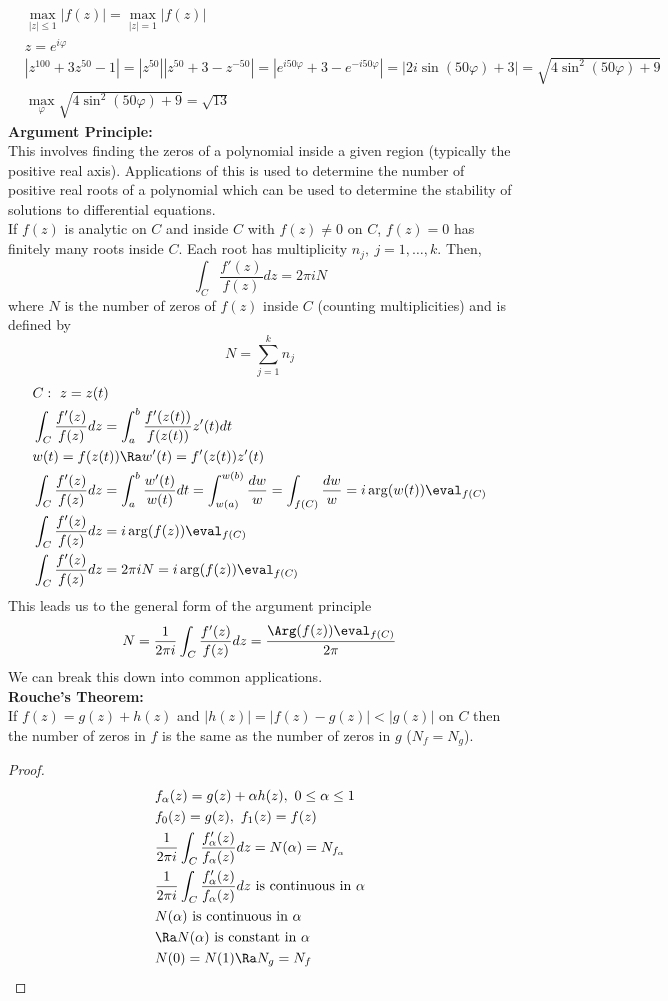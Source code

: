 \begin{align*}
    &\max_{|z|\leq1}|f(z)|=\max_{|z|=1}|f(z)|\\
    &z=e^{i\varphi}\\
    &|z^{100}+3z^{50}-1|=|z^{50}||z^{50}+3-z^{-50}|=|e^{i50\varphi}+3-e^{-i50\varphi}|=|2i\sin(50\varphi)+3|=\sqrt{4\sin^2(50\varphi)+9}\\
    &\max_{\varphi}\sqrt{4\sin^2(50\varphi)+9}=\sqrt{13}
\end{align*}
\textbf{Argument Principle:}\\
This involves finding the zeros of a polynomial inside a given region (typically the positive real axis). Applications of this is used to determine the number of positive real roots of a polynomial which can be used to determine the stability of solutions to differential equations.\\
If $f(z)$ is analytic on $C$ and inside $C$ with $f(z)\neq0$ on $C$, $f(z)=0$ has finitely many roots inside $C$. Each root has multiplicity $n_j,\ j=1,\ldots,k$. Then,
\[\int_C\frac{f'(z)}{f(z)}dz=2\pi iN\]
where $N$ is the number of zeros of $f(z)$ inside $C$ (counting multiplicities) and is defined by
\[N=\sum_{j=1}^k n_j\]
\begin{align*}
    &C:\ z=z(t)\\
    &\int_C\frac{f'(z)}{f(z)}dz=\int_a^b\frac{f'(z(t))}{f(z(t))}z'(t)dt\\
    &w(t)=f(z(t))\Ra w'(t)=f'(z(t))z'(t)\\
    &\int_C\frac{f'(z)}{f(z)}dz=\int_a^b\frac{w'(t)}{w(t)}dt=\int_{w(a)}^{w(b)}\frac{dw}{w}=\int_{f(C)}\frac{dw}{w}=i\arg(w(t))\eval_{f(C)}\\
    &\int_C\frac{f'(z)}{f(z)}dz=i\arg(f(z))\eval_{f(C)}\\
    &\int_C\frac{f'(z)}{f(z)}dz=2\pi iN=i\arg(f(z))\eval_{f(C)}
\end{align*}
This leads us to the general form of the argument principle
\[N=\frac{1}{2\pi i}\int_C\frac{f'(z)}{f(z)}dz=\frac{\Arg(f(z))\eval_{f(C)}}{2\pi}\]
We can break this down into common applications.\\
\textbf{Rouche's Theorem:}\\
If $f(z)=g(z)+h(z)$ and $|h(z)|=|f(z)-g(z)|<|g(z)|$ on $C$ then the number of zeros in $f$ is the same as the number of zeros in $g$ ($N_f=N_g$).
\begin{proof}
\begin{align*}
    &f_\alpha(z)=g(z)+\alpha h(z),\ 0\leq\alpha\leq 1\\
    &f_0(z)=g(z),\ f_1(z)=f(z)\\
    &\frac{1}{2\pi i}\int_C\frac{f_\alpha'(z)}{f_\alpha(z)}dz=N(\alpha)=N_{f_\alpha}\\
    &\frac{1}{2\pi i}\int_C\frac{f_\alpha'(z)}{f_\alpha(z)}dz\text{ is continuous in }\alpha\\
    &N(\alpha)\text{ is continuous in }\alpha\\
    &\Ra N(\alpha)\text{ is constant in }\alpha\\
    &N(0)=N(1)\Ra N_g=N_f
\end{align*}
\end{proof}
